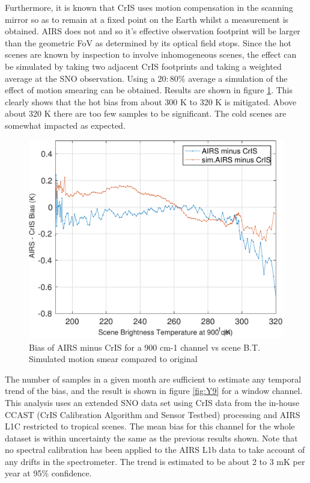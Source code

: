 \documentclass[twocolumn,10pt]{article}
\begin{document}
Furthermore, it is known that CrIS uses motion compensation in the scanning mirror so as to remain at a fixed point on the Earth whilst a measurement is obtained. AIRS does not and so it's effective observation footprint will be larger than the geometric FoV as determined by its optical field stops. Since the hot scenes are known by inspection to involve inhomogeneous scenes, the effect can be simulated by taking two adjacent CrIS footprints and taking a weighted average at the SNO observation. Using a $20:80 \% $ average a simulation of the effect of motion smearing can be obtained. Results are shown in figure \ref{fig:Y8}. This clearly shows that the hot bias from about 300 K to 320 K is mitigated. Above about 320 K there are too few samples to be significant. The cold scenes are somewhat impacted as expected.

\begin{figure}[htb]
\centering
\includegraphics[width=\linewidth]{./figs/2013_AC_quantile_wSimAIRS.pdf}
\caption{\label{fig:orgparagraph18}
  Bias of AIRS minus CrIS for a 900 cm-1 channel vs scene B.T. Simulated motion smear compared to original}
\label{fig:Y8}
\end{figure}

The number of samples in a given month are sufficient to estimate any temporal trend of the bias, and the result is shown in figure \ref{fig:Y9} for a window channel. This analysis uses an extended SNO data set using CrIS data from the in-house CCAST (CrIS Calibration Algorithm and Sensor Testbed) processing \cite{Motteler2014} and AIRS L1C restricted to tropical scenes. The mean
bias for this channel for the whole dataset is within uncertainty the same as the previous results shown. Note that no spectral calibration has been applied to the AIRS L1b data to take account of any drifts in the spectrometer. The trend is estimated to be about 2 to 3 mK per year at 95\% confidence. 
\end{document}
